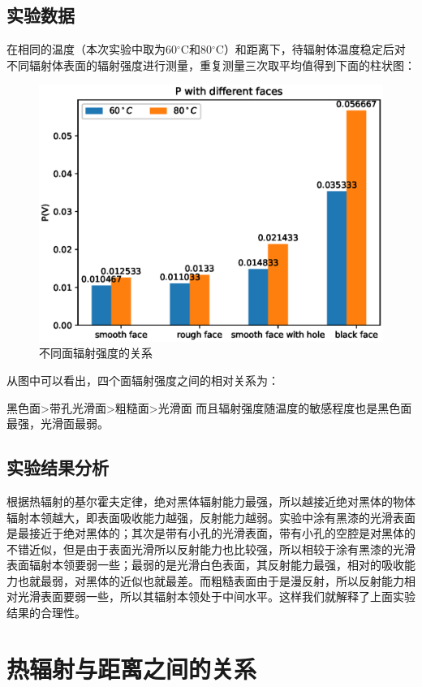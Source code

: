 \documentclass{WHUReport}
\begin{document}
\begin{multicols}{2}
	\subsection{实验数据}
	在相同的温度（本次实验中取为$60\operatorname{^\circ C}$和$ 80\operatorname{^\circ C}$）和距离下，待辐射体温度稳定后对不同辐射体表面的辐射强度进行测量，重复测量三次取平均值得到下面的柱状图：
	\begin{figure}[H]
		\centering
		\includegraphics[width=\linewidth]{figs/diff_face.eps}
		\caption{不同面辐射强度的关系}
	\end{figure}
	从图中可以看出，四个面辐射强度之间的相对关系为：
	
	{\centering 黑色面>带孔光滑面>粗糙面>光滑面}
	而且辐射强度随温度的敏感程度也是黑色面最强，光滑面最弱。
	\subsection{实验结果分析}
	根据热辐射的基尔霍夫定律，绝对黑体辐射能力最强，所以越接近绝对黑体的物体辐射本领越大，即表面吸收能力越强，反射能力越弱。实验中涂有黑漆的光滑表面是最接近于绝对黑体的；其次是带有小孔的光滑表面，带有小孔的空腔是对黑体的不错近似，但是由于表面光滑所以反射能力也比较强，所以相较于涂有黑漆的光滑表面辐射本领要弱一些；最弱的是光滑白色表面，其反射能力最强，相对的吸收能力也就最弱，对黑体的近似也就最差。而粗糙表面由于是漫反射，所以反射能力相对光滑表面要弱一些，所以其辐射本领处于中间水平。这样我们就解释了上面实验结果的合理性。
	\section{热辐射与距离之间的关系}

\end{multicols}
\end{document}
